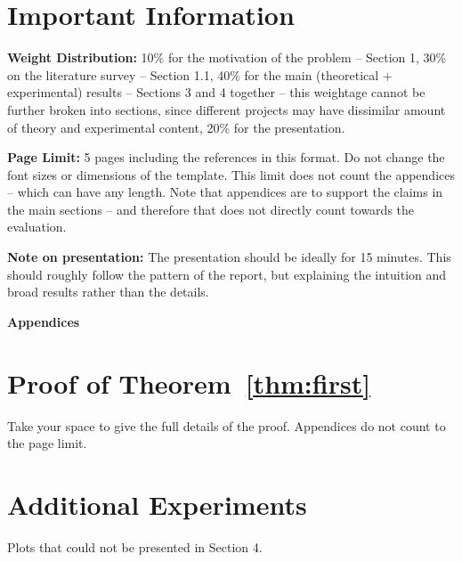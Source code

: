 \documentclass[twoside]{article}
\begin{document}
\section*{Important Information}

{\bf Weight Distribution:} 10\% for the motivation of the problem -- Section 1, 30\% on the literature survey -- Section 1.1, 40\% for the main (theoretical + experimental) results -- Sections 3 and 4 together -- this weightage cannot be further broken into sections, since different projects may have dissimilar amount of theory and experimental content, 20\% for the presentation.

{\bf Page Limit:} 5 pages including the references in this format. Do not change the font sizes or dimensions of the template. This limit does not count the appendices -- which can have any length. Note that appendices are to support the claims in the main sections -- and therefore that does not directly count towards the evaluation.

{\bf Note on presentation:} The presentation should be ideally for 15 minutes. This should roughly follow the pattern of the report, but explaining the intuition and broad results rather than the details.

\begin{center}
 \Large{\bf Appendices}
\end{center}

\appendix

\section{Proof of Theorem~\ref{thm:first}}

Take your space to give the full details of the proof. Appendices do not count to the page limit.

\section{Additional Experiments}

Plots that could not be presented in Section 4.
\end{document}
